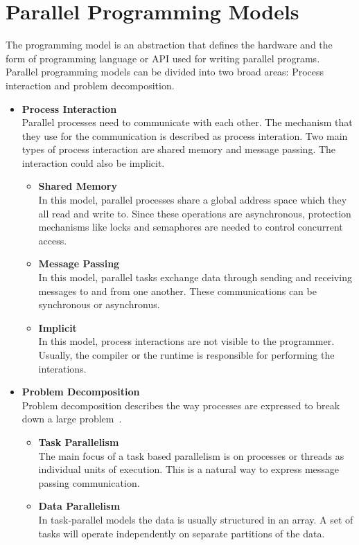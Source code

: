 \section{Parallel Programming Models}
The programming model is an abstraction that defines the hardware and the form of programming language or API used for writing parallel programs.
Parallel programming models can be divided into two broad areas: Process interaction and problem decomposition.~\cite{parallelprogrammingmodels}
\begin{itemize}
\item \textbf{Process Interaction}\\
  Parallel processes need to communicate with each other. The mechanism that they use for the communication is described as process interation. Two main types of process interaction are shared memory and message passing. The interaction could also be implicit.
  \begin{itemize}
  \item \textbf{Shared Memory}\\
    In this model, parallel processes share a global address space which they all read and write to. Since these operations are asynchronous, protection mechanisms like locks and semaphores are needed to control concurrent access.
  \item \textbf{Message Passing}\\
    In this model, parallel tasks exchange data through sending and receiving messages to and from one another. These communications can be synchronous or asynchronus.
  \item \textbf{Implicit}\\
    In this model, process interactions are not visible to the programmer. Usually, the compiler or the runtime is responsible for performing the interations.
  \end{itemize}
\item \textbf{Problem Decomposition}\\
Problem decomposition describes the way processes are expressed to break down a large problem~\cite{Quinn:2003:PPC:1211440}.
  \begin{itemize}
  \item \textbf{Task Parallelism}\\
    The main focus of a task based parallelism is on processes or threads as individual units of execution. This is a natural way to express message passing communication.
  \item \textbf{Data Parallelism}\\
    In task-parallel models the data is usually structured in an array. A set of tasks will operate independently on separate partitions of the data.     
  \end{itemize}
\end{itemize}


